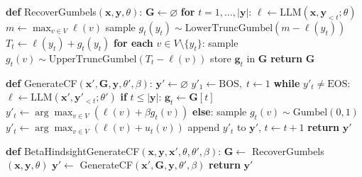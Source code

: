 \begin{algorithm*}
\caption{Expanded $\beta$-Hindsight Control Algorithm with Comments}
\label{alg:gumbel-cf-long}
\begin{algorithmic}[1]

\STATE \textbf{def} RecoverGumbels$(\mathbf x, \mathbf y, \theta)$:
\STATE \quad $\mathbf G \gets \varnothing$
\STATE \quad \textbf{for} $t=1,\dots,|\mathbf y|$: 
\STATE \qquad $\ell \gets \mathrm{LLM}(\mathbf x, \mathbf y_{<t};\theta)$ 
\STATE \qquad $m \gets \max_{v\in V} \ell(v)$
\STATE \qquad sample $g_t(y_t) \sim \mathrm{LowerTruncGumbel}(m - \ell(y_t))$
\STATE \qquad $T_t \gets \ell(y_t) + g_t(y_t)$
\STATE \qquad \textbf{for each} $v \in V \setminus \{y_t\}$:
\STATE \qquad\quad sample $g_t(v) \sim \mathrm{UpperTruncGumbel}(T_t - \ell(v))$
\STATE \qquad store $\mathbf g_t$ in $\mathbf G$
\STATE \quad \textbf{return} $\mathbf G$
\vspace{6pt}

\STATE \textbf{def} GenerateCF$(\mathbf x', \mathbf G, \mathbf y, \theta', \beta)$:
\STATE \quad $\mathbf y' \gets \varnothing$
\STATE \quad $y'_1 \gets \mathrm{BOS},\; t \gets 1$
\STATE \quad \textbf{while} $y'_t \neq \mathrm{EOS}$:
\STATE \qquad $\ell \gets \mathrm{LLM}(\mathbf x', \mathbf y'_{<t};\theta')$ 
\STATE \qquad \textbf{if} $t \le |\mathbf y|$:
\STATE \qquad\quad $\mathbf g_t \gets \mathbf G[t]$ 
\STATE \qquad\quad $y'_t \gets \arg\max_{v\in V}(\ell(v) + \beta g_t(v))$
\STATE \qquad \textbf{else}:
\STATE \qquad\quad sample $g_t(v) \sim \mathrm{Gumbel}(0,1)$ 
\STATE \qquad\quad $y'_t \gets \arg\max_{v\in V}(\ell(v) + u_t(v))$
\STATE \qquad append $y'_t$ to $\mathbf y'$,  $t \gets t+1$
\STATE \quad \textbf{return} $\mathbf y'$
\vspace{6pt}

\STATE \textbf{def} BetaHindsightGenerateCF$(\mathbf x, \mathbf y, \mathbf x', \theta, \theta', \beta)$:
\STATE \quad $\mathbf G \gets$ RecoverGumbels$(\mathbf x, \mathbf y, \theta)$
\STATE \quad $\mathbf y' \gets$ GenerateCF$(\mathbf x', \mathbf G, \mathbf y, \theta', \beta)$
\STATE \quad \textbf{return} $\mathbf y'$
\end{algorithmic}
\end{algorithm*}